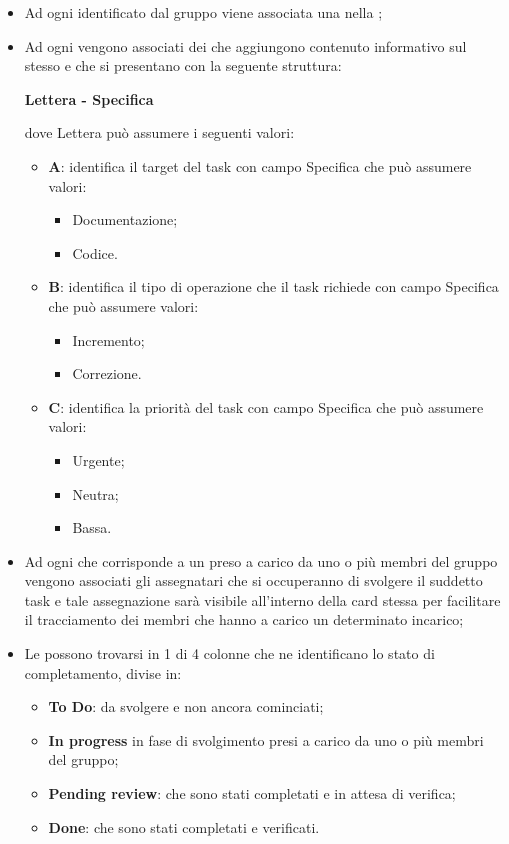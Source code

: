 		\begin{itemize}
			\item Ad ogni  identificato dal gruppo viene associata una  nella ;
			\item Ad ogni  vengono associati dei  che aggiungono contenuto informativo sul  stesso e che si presentano con la seguente struttura: 
			\begin{center}
	 			{\bfseries Lettera - Specifica}
	 		\end{center}
dove Lettera può assumere i seguenti valori:
			\begin{itemize}
				\item \textbf{A}: identifica il target del task con campo Specifica che può assumere valori:
				\begin{itemize}
					\item Documentazione;
					\item Codice.
				\end{itemize}
				\item \textbf{B}: identifica il tipo di operazione che il task richiede con campo Specifica che può assumere valori:
				\begin{itemize}
					\item Incremento;
					\item Correzione.
				\end{itemize}
				\item \textbf{C}: identifica la priorità del task con campo Specifica che può assumere valori:
				\begin{itemize}
					\item Urgente;
					\item Neutra;
					\item Bassa.
				\end{itemize}
			\end{itemize}
			\item Ad ogni  che corrisponde a un  preso a carico da uno o più membri del gruppo vengono associati gli assegnatari che si occuperanno di svolgere il suddetto task e tale assegnazione sarà visibile all'interno della card stessa per facilitare il tracciamento dei membri che hanno a carico un determinato incarico;  
			\item Le  possono trovarsi in 1 di 4 colonne che ne identificano lo stato di completamento, divise in:
			\begin{itemize}
				\item \textbf{To Do}:  da svolgere e non ancora cominciati;
				\item \textbf{In progress}  in fase di svolgimento presi a carico da uno o più membri del gruppo;
				\item \textbf{Pending review}:  che sono stati completati e in attesa di verifica;
				\item \textbf{Done}:  che sono stati completati e verificati.
			\end{itemize}			 
		\end{itemize}
